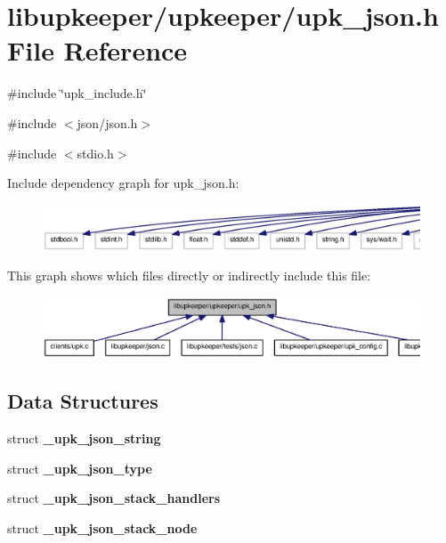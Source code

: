 \section{libupkeeper/upkeeper/upk\_\-json.h File Reference}
\label{upk__json_8h}
{\ttfamily \#include \char`\"{}upk\_\-include.h\char`\"{}}\par
{\ttfamily \#include $<$json/json.h$>$}\par
{\ttfamily \#include $<$stdio.h$>$}\par
Include dependency graph for upk\_\-json.h:\nopagebreak
\begin{figure}[H]
\begin{center}
\leavevmode
\includegraphics[width=400pt]{upk__json_8h__incl}
\end{center}
\end{figure}
This graph shows which files directly or indirectly include this file:
\nopagebreak
\begin{figure}[H]
\begin{center}
\leavevmode
\includegraphics[width=400pt]{upk__json_8h__dep__incl}
\end{center}
\end{figure}
\subsection*{Data Structures}
\begin{DoxyCompactItemize}
\item 
struct {\bf \_\-upk\_\-json\_\-string}
\item 
struct {\bf \_\-upk\_\-json\_\-type}
\item 
struct {\bf \_\-upk\_\-json\_\-stack\_\-handlers}
\item 
struct {\bf \_\-upk\_\-json\_\-stack\_\-node}
\end{DoxyCompactItemize}
